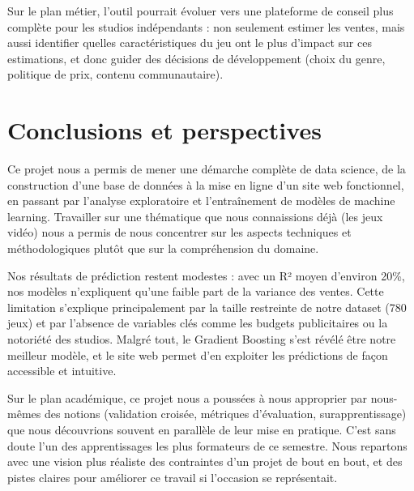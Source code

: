 \documentclass[mstat,12pt]{unswthesis}
\begin{document}
Sur le plan métier, l'outil pourrait évoluer vers une plateforme de conseil plus complète pour les studios indépendants : non seulement estimer les ventes, mais aussi identifier quelles caractéristiques du jeu ont le plus d'impact sur ces estimations, et donc guider des décisions de développement (choix du genre, politique de prix, contenu communautaire).



\hypertarget{conclusion-et-perspectives}{%
\chapter{\textbf{Conclusions et perspectives}}\label{conclusion-et-perspectives}}


Ce projet nous a permis de mener une démarche complète de data science, de la construction d'une base de données à la mise en ligne d'un site web fonctionnel, en passant par l'analyse exploratoire et l'entraînement de modèles de machine learning. Travailler sur une thématique que nous connaissions déjà (les jeux vidéo) nous a permis de nous concentrer sur les aspects techniques et méthodologiques plutôt que sur la compréhension du domaine.

Nos résultats de prédiction restent modestes : avec un R² moyen d'environ 20\%, nos modèles n'expliquent qu'une faible part de la variance des ventes. Cette limitation s'explique principalement par la taille restreinte de notre dataset (780 jeux) et par l'absence de variables clés comme les budgets publicitaires ou la notoriété des studios. Malgré tout, le Gradient Boosting s'est révélé être notre meilleur modèle, et le site web permet d'en exploiter les prédictions de façon accessible et intuitive.

Sur le plan académique, ce projet nous a poussées à nous approprier par nous-mêmes des notions (validation croisée, métriques d'évaluation, surapprentissage) que nous découvrions souvent en parallèle de leur mise en pratique. C'est sans doute l'un des apprentissages les plus formateurs de ce semestre. Nous repartons avec une vision plus réaliste des contraintes d'un projet de bout en bout, et des pistes claires pour améliorer ce travail si l'occasion se représentait.
\end{document}
